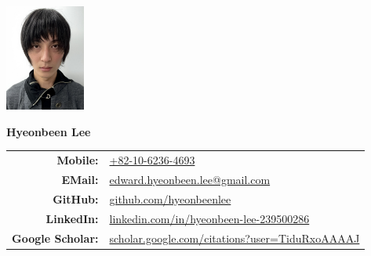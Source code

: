 \documentclass[a4paper,10pt]{extarticle}
\begin{document}
\pagestyle{empty}



\begin{minipage}{0.1\textwidth}
	\begin{flushleft}
		\includegraphics[height=3.5cm]{photo_dlicense.jpeg}
	\end{flushleft}
\end{minipage}
\hfill
\begin{minipage}{0.7\textwidth}
	\begin{flushright}
		\textbf{\Large Hyeonbeen Lee} %
		\newline\newline
		\begin{tabular}{rl}
			\textbf{Mobile: }         & \href{tel:+82-10-6236-4693}{+82-10-6236-4693}                                                                 \\
			\textbf{EMail: }          & \href{mailto:edward.hyeonbeen.lee@gmail.com}{edward.hyeonbeen.lee@gmail.com}                                  \\
			\textbf{GitHub: }         & \href{https://github.com/hyeonbeenlee}{github.com/hyeonbeenlee}                                               \\
			\textbf{LinkedIn: }       & \href{https://www.linkedin.com/in/hyeonbeen-lee-239500286/}{linkedin.com/in/hyeonbeen-lee-239500286}          \\
			\textbf{Google Scholar: } & \href{https://scholar.google.com/citations?user=TiduRxoAAAAJ}{scholar.google.com/citations?user=TiduRxoAAAAJ} \\
		\end{tabular}
	\end{flushright}

\end{minipage}
\end{document}
